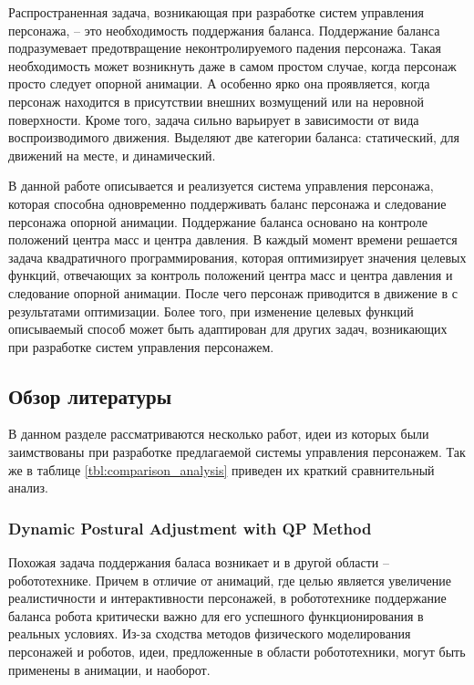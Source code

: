 Распространенная задача, возникающая при разработке систем управления персонажа, -- это необходимость поддержания баланса. Поддержание баланса подразумевает предотвращение неконтролируемого падения персонажа. Такая необходимость может возникнуть даже в самом простом случае, когда персонаж просто следует опорной анимации. А особенно ярко она проявляется, когда персонаж находится в присутствии внешних возмущений или на неровной поверхности. Кроме того, задача сильно варьирует в зависимости от вида воспроизводимого движения. Выделяют две категории баланса: статический, для движений на месте, и динамический.

В данной работе описывается и реализуется система управления персонажа, которая способна одновременно поддерживать баланс персонажа и следование персонажа опорной анимации. Поддержание баланса основано на контроле положений центра масс и центра давления. В каждый момент времени решается задача квадратичного программирования, которая оптимизирует значения целевых функций, отвечающих за контроль положений центра масс и центра давления и следование опорной анимации. После чего персонаж приводится в движение в  с результатами оптимизации. Более того, при изменение целевых функций описываемый способ может быть адаптирован для других задач, возникающих при разработке систем управления персонажем.

\subsection{Обзор литературы}

В данном разделе рассматриваются несколько работ, идеи из которых были заимствованы при разработке предлагаемой системы управления персонажем. Так же в таблице \ref{tbl:comparison_analysis} приведен их краткий сравнительный анализ.

\subsubsection{Dynamic Postural Adjustment with QP Method}

Похожая задача поддержания баласа возникает и в другой области -- робототехнике. Причем в отличие от анимаций, где целью является увеличение реалистичности и интерактивности персонажей, в робототехнике поддержание баланса робота критически важно для его успешного функционирования в реальных условиях. Из-за сходства методов физического моделирования персонажей и роботов, идеи, предложенные в области робототехники, могут быть применены в анимации, и наоборот.

